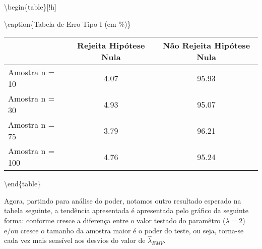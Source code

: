 \documentclass[11pt,]{article}
\begin{document}
\textbackslash{}begin\{table\}{[}!h{]}

\textbackslash{}caption\{\label{tab:unnamed-chunk-8}Tabela de Erro Tipo
I (em \%)\} \centering

\begin{tabular}[t]{lcc}
\toprule
  & Rejeita Hipótese Nula & Não Rejeita Hipótese Nula\\
\midrule
Amostra n = 10 & 4.07 & 95.93\\
Amostra n = 30 & 4.93 & 95.07\\
Amostra n = 75 & 3.79 & 96.21\\
Amostra n = 100 & 4.76 & 95.24\\
\bottomrule
\end{tabular}

\textbackslash{}end\{table\}

Agora, partindo para análise do poder, notamos outro resultado esperado
na tabela seguinte, a tendência apresentada é apresentada pelo gráfico
da seguinte forma: conforme cresce a diferença entre o valor testado do
paramêtro (\(\lambda = 2\)) e/ou cresce o tamanho da amostra maior é o
poder do teste, ou seja, torna-se cada vez mais sensível aos desvios do
valor de \(\hat{\lambda}_{EMV}\).
\end{document}
